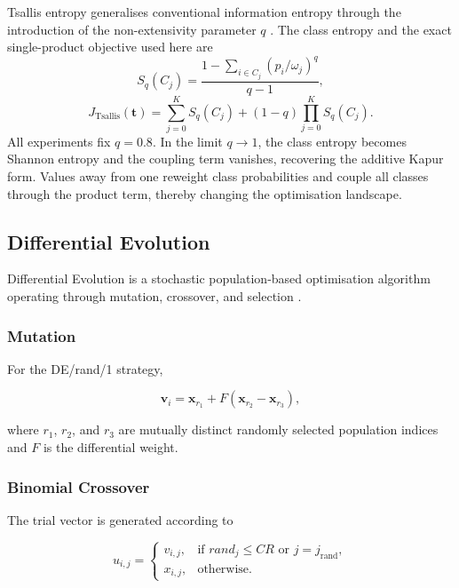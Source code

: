 \documentclass[review,authoryear]{elsarticle}
\begin{document}
Tsallis entropy generalises conventional information entropy through
the introduction of the non-extensivity parameter $q$
\citep{tsallis1988generalization}. The class entropy and the exact
single-product objective used here are
\begin{equation}
S_q(C_j)=\frac{1-\sum_{i\in C_j}(p_i/\omega_j)^q}{q-1},
\end{equation}
\begin{equation}
J_{\mathrm{Tsallis}}(\mathbf{t})=
\sum_{j=0}^{K}S_q(C_j)+(1-q)\prod_{j=0}^{K}S_q(C_j).
\end{equation}
All experiments fix $q=0.8$. In the limit $q\rightarrow1$, the class
entropy becomes Shannon entropy and the coupling term vanishes, recovering
the additive Kapur form. Values away from one reweight class probabilities
and couple all classes through the product term, thereby changing the
optimisation landscape.


\subsection{Differential Evolution}
\label{sec:de_background}

Differential Evolution is a stochastic population-based optimisation
algorithm operating through mutation, crossover, and selection
\citep{storn1997differential}.

\subsubsection{Mutation}

For the DE/rand/1 strategy,

\begin{equation}
\mathbf{v}_{i}
=
\mathbf{x}_{r_1}
+
F
\left(
\mathbf{x}_{r_2}
-
\mathbf{x}_{r_3}
\right),
\end{equation}

where $r_1$, $r_2$, and $r_3$ are mutually distinct randomly selected
population indices and $F$ is the differential weight.


\subsubsection{Binomial Crossover}

The trial vector is generated according to

\begin{equation}
u_{i,j}
=
\begin{cases}
v_{i,j},
& \text{if } rand_j \leq CR
\text{ or } j=j_{\mathrm{rand}}, \\

x_{i,j},
& \text{otherwise}.
\end{cases}
\end{equation}
\end{document}
